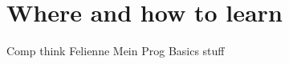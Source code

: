 \documentclass[runningheads]{llncs}
\begin{document}
\section{Where and how to learn}

Comp think
Felienne
Mein Prog Basics stuff












\end{document}
